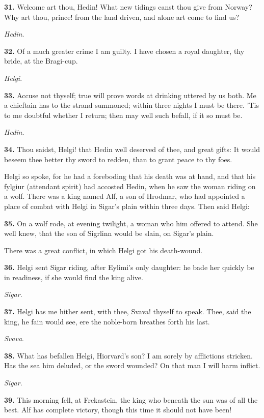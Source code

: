 \textbf{31.} Welcome art thou, Hedin! What new tidings canst thou give from
Norway? Why art thou, prince! from the land driven, and alone art come
to find us?

\emph{Hedin}.

\textbf{32.} Of a much greater crime I am guilty. I have chosen a royal
daughter, thy bride, at the Bragi-cup.

\emph{Helgi}.

\textbf{33.} Accuse not thyself; true will prove words at drinking uttered by
us both. Me a chieftain has to the strand summoned; within three
nights I must be there. 'Tis to me doubtful whether I return; then may
well such befall, if it so must be.

\emph{Hedin}.

\textbf{34.} Thou saidst, Helgi! that Hedin well deserved of thee, and great
gifts: It would beseem thee better thy sword to redden, than to grant
peace to thy foes.

Helgi so spoke, for he had a foreboding that his death was at hand,
and that his fylgiur (attendant spirit) had accosted Hedin, when he
saw the woman riding on a wolf. There was a king named Alf, a son of
Hrodmar, who had appointed a place of combat with Helgi in Sigar's
plain within three days. Then said Helgi:

\textbf{35.} On a wolf rode, at evening twilight, a woman who him offered to
attend. She well knew, that the son of Sigrlinn would be slain, on
Sigar's plain.

There was a great conflict, in which Helgi got his death-wound.

\textbf{36.} Helgi sent Sigar riding, after Eylimi's only daughter: he bade
her quickly be in readiness, if she would find the king alive.

\emph{Sigar}.

\textbf{37.} Helgi has me hither sent, with thee, Svava! thyself to speak.
Thee, said the king, he fain would see, ere the noble-born breathes
forth his last.

\emph{Svava}.

\textbf{38.} What has befallen Helgi, Hiorvard's son? I am sorely by
afflictions stricken. Has the sea him deluded, or the sword wounded?
On that man I will harm inflict.

\emph{Sigar}.

\textbf{39.} This morning fell, at Frekastein, the king who beneath the sun
was of all the best. Alf has complete victory, though this time it
should not have been!

